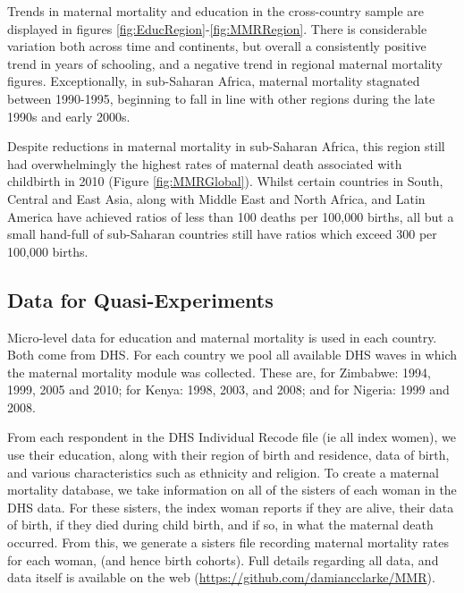 \documentclass{article}[12pt,subeqn]
\begin{document}
\begin{spacing}{1.4}
Trends in maternal mortality and education in the cross-country sample are 
displayed in figures \ref{fig:EducRegion}-\ref{fig:MMRRegion}. There is 
considerable variation both across time and continents, but overall a 
consistently positive trend in years of schooling, and a negative trend in 
regional maternal mortality figures. Exceptionally, in sub-Saharan Africa, 
maternal mortality stagnated between 1990-1995, beginning to fall in line with 
other regions during the late 1990s and early 2000s.

Despite reductions in maternal mortality in sub-Saharan Africa, this region still 
had overwhelmingly the highest rates of maternal death associated with childbirth 
in 2010 (Figure \ref{fig:MMRGlobal}). Whilst certain countries in South, Central 
and East Asia, along with Middle East and North Africa, and Latin America have 
achieved ratios of less than 100 deaths per 100,000 births, all but a small 
hand-full of sub-Saharan countries still have ratios which exceed 300 per 100,000 
births.

\subsection{Data for Quasi-Experiments}
Micro-level data for education and maternal mortality is used in each country.
Both come from DHS.  For each country we pool all available DHS waves in which
the maternal mortality module was collected.  These are, for Zimbabwe: 1994, 
1999, 2005 and 2010; for Kenya: 1998, 2003, and 2008; and for Nigeria: 1999 and
2008.

From each respondent in the DHS Individual Recode file (ie all index women), we
use their education, along with their region of birth and residence, data of 
birth, and various characteristics such as ethnicity and religion.  To create a
maternal mortality database, we take information on all of the sisters of each
woman in the DHS data.  For these sisters, the index woman reports if they are
alive, their data of birth, if they died during child birth, and if so, in what 
the maternal death occurred.  From this, we generate a sisters file recording 
maternal mortality rates for each woman, (and hence birth cohorts). Full details
regarding all data, and data itself is available on the web
(\url{https://github.com/damiancclarke/MMR}).


\end{spacing}
\end{document}
